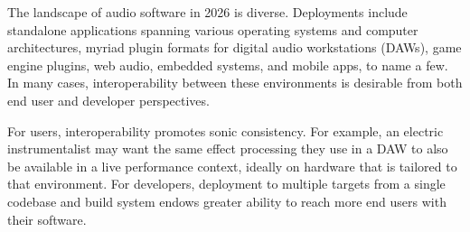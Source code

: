 



The landscape of audio software in 2026 is diverse. Deployments include standalone applications spanning various operating systems and computer architectures, myriad plugin formats for digital audio workstations (DAWs), game engine plugins, web audio, embedded systems, and mobile apps, to name a few. In many cases, interoperability between these environments is desirable from both end user and developer perspectives.

For users, interoperability promotes sonic consistency. For example, an electric instrumentalist may want the same effect processing they use in a DAW to also be available in a live performance context, ideally on hardware that is tailored to that environment. For developers, deployment to multiple targets from a single codebase and build system endows greater ability to reach more end users with their software.




